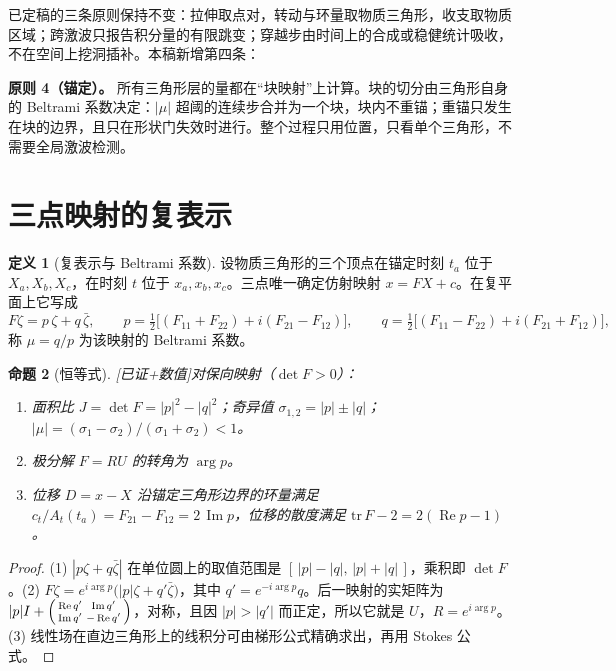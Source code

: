 \documentclass[10.5pt,a4paper]{article}
\newcommand{\keyp}[1]{\textbf{\sffamily #1}}
\newenvironment{finding}{\begin{center}\begin{minipage}{0.94\linewidth}\setlength{\parskip}{0.3em}\color{black}}{\end{minipage}\end{center}}
\theoremstyle{definition}
\newtheorem{definition}{定义}[section]
\theoremstyle{plain}
\newtheorem{proposition}[definition]{命题}
\theoremstyle{remark}
\newcommand{\status}[1]{\hfill{\small\color{accent}\textsf{[#1]}}}
\newcommand{\re}{\operatorname{Re}}
\newcommand{\im}{\operatorname{Im}}
\begin{document}
已定稿的三条原则保持不变：拉伸取点对，转动与环量取物质三角形，收支取物质区域；跨激波只报告积分量的有限跳变；穿越步由时间上的合成或稳健统计吸收，不在空间上挖洞插补。本稿新增第四条：

\begin{finding}
\keyp{原则 4（锚定）。} 所有三角形层的量都在“块映射”上计算。块的切分由三角形自身的 Beltrami 系数决定：$|\mu|$ 超阈的连续步合并为一个块，块内不重锚；重锚只发生在块的边界，且只在形状门失效时进行。整个过程只用位置，只看单个三角形，不需要全局激波检测。
\end{finding}

\section{三点映射的复表示}\label{sec:complex}

\begin{definition}[复表示与 Beltrami 系数]
设物质三角形的三个顶点在锚定时刻 $t_a$ 位于 $X_a,X_b,X_c$，在时刻 $t$ 位于 $x_a,x_b,x_c$。三点唯一确定仿射映射 $x=FX+c$。在复平面上它写成
\begin{equation}
F\zeta=p\,\zeta+q\,\bar\zeta,\qquad
p=\tfrac12\big[(F_{11}+F_{22})+i(F_{21}-F_{12})\big],\qquad
q=\tfrac12\big[(F_{11}-F_{22})+i(F_{21}+F_{12})\big],
\end{equation}
称 $\mu=q/p$ 为该映射的 Beltrami 系数。
\end{definition}

\begin{proposition}[恒等式]\status{已证+数值}\label{prop:id}
对保向映射（$\det F>0$）：
\begin{enumerate}
\item 面积比 $J=\det F=|p|^2-|q|^2$；奇异值 $\sigma_{1,2}=|p|\pm|q|$；$|\mu|=(\sigma_1-\sigma_2)/(\sigma_1+\sigma_2)<1$。
\item 极分解 $F=RU$ 的转角为 $\arg p$。
\item 位移 $D=x-X$ 沿锚定三角形边界的环量满足 $c_t/A_t(t_a)=F_{21}-F_{12}=2\,\im p$，位移的散度满足 $\mathrm{tr}\,F-2=2(\re p-1)$。
\end{enumerate}
\end{proposition}
\begin{proof}
(1) $|p\zeta+q\bar\zeta|$ 在单位圆上的取值范围是 $[\,|p|-|q|,\,|p|+|q|\,]$，乘积即 $\det F$。(2) $F\zeta=e^{i\arg p}\big(|p|\zeta+q'\bar\zeta\big)$，其中 $q'=e^{-i\arg p}q$。后一映射的实矩阵为 $|p|I+\begin{psmallmatrix}\re q'&\im q'\\ \im q'&-\re q'\end{psmallmatrix}$，对称，且因 $|p|>|q'|$ 而正定，所以它就是 $U$，$R=e^{i\arg p}$。(3) 线性场在直边三角形上的线积分可由梯形公式精确求出，再用 Stokes 公式。
\end{proof}
\end{document}
